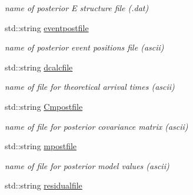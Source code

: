 \begin{DoxyCompactItemize}
\begin{DoxyCompactList}\small\item\em name of posterior E structure file (.dat) \end{DoxyCompactList}\item 
\hypertarget{class_parameters_ab3eb89fdf1b78f161c06c0db824766a2}{}std\+::string \hyperlink{class_parameters_ab3eb89fdf1b78f161c06c0db824766a2}{eventpostfile}\label{class_parameters_ab3eb89fdf1b78f161c06c0db824766a2}

\begin{DoxyCompactList}\small\item\em name of posterior event positions file (ascii) \end{DoxyCompactList}\item 
\hypertarget{class_parameters_a63aca1b68e0c3a3719eff262f0d537d3}{}std\+::string \hyperlink{class_parameters_a63aca1b68e0c3a3719eff262f0d537d3}{dcalcfile}\label{class_parameters_a63aca1b68e0c3a3719eff262f0d537d3}

\begin{DoxyCompactList}\small\item\em name of file for theoretical arrival times (ascii) \end{DoxyCompactList}\item 
\hypertarget{class_parameters_aad74d1327d7ac7eb90dfc6b3b6bdef03}{}std\+::string \hyperlink{class_parameters_aad74d1327d7ac7eb90dfc6b3b6bdef03}{Cmpostfile}\label{class_parameters_aad74d1327d7ac7eb90dfc6b3b6bdef03}

\begin{DoxyCompactList}\small\item\em name of file for posterior covariance matrix (ascii) \end{DoxyCompactList}\item 
\hypertarget{class_parameters_ad432587d4e468340b10f6e0f5c171f07}{}std\+::string \hyperlink{class_parameters_ad432587d4e468340b10f6e0f5c171f07}{mpostfile}\label{class_parameters_ad432587d4e468340b10f6e0f5c171f07}

\begin{DoxyCompactList}\small\item\em name of file for posterior model values (ascii) \end{DoxyCompactList}\item 
\hypertarget{class_parameters_a1270dd90767f117031f0aac51f30f886}{}std\+::string \hyperlink{class_parameters_a1270dd90767f117031f0aac51f30f886}{residualfile}\label{class_parameters_a1270dd90767f117031f0aac51f30f886}


\end{DoxyCompactItemize}
